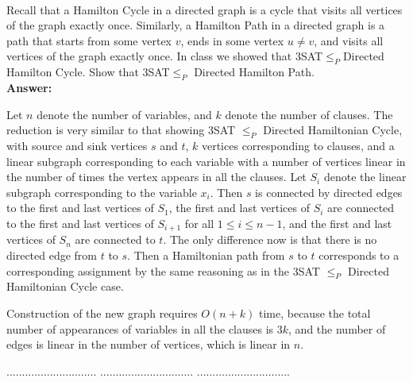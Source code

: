 \documentclass[a4paper,11pt]{article}
\begin{document}
\\
Recall that a Hamilton Cycle in a directed graph is a cycle that visits all vertices of the graph exactly once.
Similarly, a Hamilton Path in a directed graph is a path that starts 
from some vertex $v$, ends in some vertex $u\neq v$, and visits all vertices of the graph exactly once.
In class we showed that 3SAT$\leq_P$Directed Hamilton Cycle. 
Show that 3SAT$\leq_P$ Directed Hamilton Path. \\
{\bf Answer:} \par
Let $n$ denote the number of variables, and $k$ denote the number of clauses. The reduction is very similar to that showing 3SAT $\leq_P$ Directed Hamiltonian Cycle, with source and sink vertices $s$ and $t$, $k$ vertices corresponding to clauses, and a linear subgraph corresponding to each variable with a number of vertices linear in the number of times the vertex appears in all the clauses. Let $S_i$ denote the linear subgraph corresponding to the variable $x_i$. Then $s$ is connected by directed edges to the first and last vertices of $S_1$, the first and last vertices of $S_i$ are connected to the first and last vertices of $S_{i + 1}$ for all $1 \leq i \leq n - 1$, and the first and last vertices of $S_n$ are connected to $t$. The only difference now is that there is no directed edge from $t$ to $s$. Then a Hamiltonian path from $s$ to $t$ corresponds to a corresponding assignment by the same reasoning as in the 3SAT $\leq_P$ Directed Hamiltonian Cycle case. \par
Construction of the new graph requires $O(n + k)$ time, because the total number of appearances of variables in all the clauses is $3k$, and the number of edges is linear in the number of vertices, which is linear in $n$.

\pagebreak

 $.............................$
 $..............................$
          $..............................$\\

\bigskip
\end{document}
